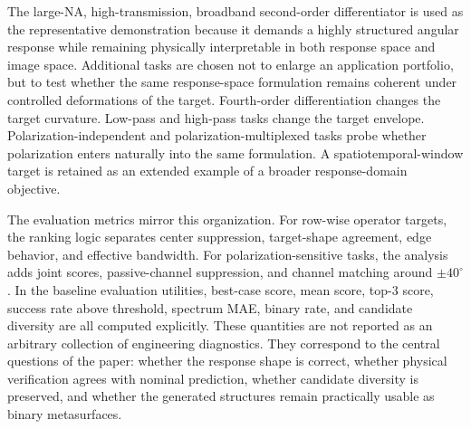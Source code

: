 The large-NA, high-transmission, broadband second-order differentiator is used as the representative demonstration because it demands a highly structured angular response while remaining physically interpretable in both response space and image space. Additional tasks are chosen not to enlarge an application portfolio, but to test whether the same response-space formulation remains coherent under controlled deformations of the target. Fourth-order differentiation changes the target curvature. Low-pass and high-pass tasks change the target envelope. Polarization-independent and polarization-multiplexed tasks probe whether polarization enters naturally into the same formulation. A spatiotemporal-window target is retained as an extended example of a broader response-domain objective.

The evaluation metrics mirror this organization. For row-wise operator targets, the ranking logic separates center suppression, target-shape agreement, edge behavior, and effective bandwidth. For polarization-sensitive tasks, the analysis adds joint scores, passive-channel suppression, and channel matching around $\pm40^\circ$. In the baseline evaluation utilities, best-case score, mean score, top-3 score, success rate above threshold, spectrum MAE, binary rate, and candidate diversity are all computed explicitly. These quantities are not reported as an arbitrary collection of engineering diagnostics. They correspond to the central questions of the paper: whether the response shape is correct, whether physical verification agrees with nominal prediction, whether candidate diversity is preserved, and whether the generated structures remain practically usable as binary metasurfaces.
